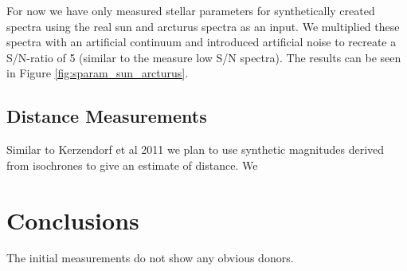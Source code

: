 For now we have only measured stellar parameters for synthetically created spectra using the real sun and arcturus spectra as an input. We multiplied these spectra with an artificial continuum and introduced artificial noise to recreate a S/N-ratio of 5 (similar to the measure low S/N spectra). The results can be seen in Figure \ref{fig:sparam_sun_arcturus}.


\subsection{Distance Measurements}

Similar to Kerzendorf et al 2011 we plan to use synthetic magnitudes derived from isochrones to give an estimate of distance. 
We 

\section{Conclusions}

The initial measurements do not show any obvious donors. 

